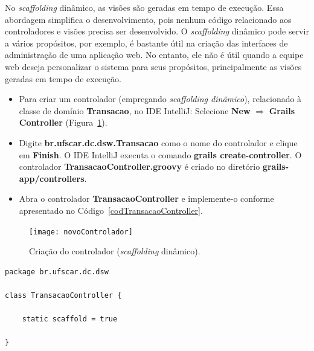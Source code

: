 \vspace{0.3cm}

No {\it scaffolding} dinâmico, as visões são geradas em tempo de execução.  Essa
abordagem  simplifica  o desenvolvimento,  pois  nenhum  código relacionado  aos
controladores e  visões precisa ser desenvolvido.  O  {\it scaffolding} dinâmico
pode servir  a vários propósitos,  por exemplo, é  bastante útil na  criação das
interfaces de  administração de uma  aplicação web. No  entanto, ele não  é útil
quando  a  equipe  web  deseja  personalizar o  sistema  para  seus  propósitos,
principalmente as visões geradas em tempo de execução. 

\vspace{0.3cm}

\begin{itemize}

\item  Para  criar  um  controlador  (empregando  {\it  scaffolding  dinâmico}),
  relacionado à  classe de domínio  {\bf Transacao}, no IDE  IntelliJ: Selecione
  {\bf       New}      $\Longrightarrow$      {\bf       Grails      Controller}
  (Figura~\ref{novoControladorFig}).  

\vspace{0.3cm}

\item  Digite {\bf  br.ufscar.dc.dsw.Transacao}  como o  nome  do controlador  e
  clique  em  {\bf  Finish}.  O  IDE  IntelliJ  executa  o comando  {\bf  grails
    create-controller}.  O controlador {\bf TransacaoController.groovy} é criado
  no    diretório    {\bf    grails-app/controllers}.      

\vspace{0.3cm}

\item  Abra  o controlador  {\bf  TransacaoController}  e implemente-o  conforme
  apresentado no Código~\ref{codTransacaoController}.

\end{itemize}

\vspace{0.5cm}

\begin{figure}[htbp]
\centering\texttt{[image: novoControlador]}
\caption{Criação do controlador ({\it scaffolding} dinâmico).}
\label{novoControladorFig}
\end{figure}

\begin{lstlisting}[caption=Controlador {\bf TransacaoController (1)}, frame =
    trBL, float=htbp, label=codTransacaoController] 
package br.ufscar.dc.dsw

class TransacaoController {
    
    static scaffold = true

}
\end{lstlisting}

